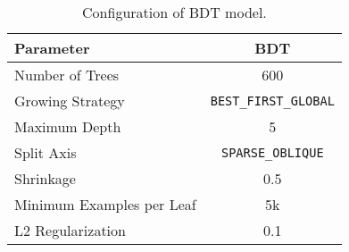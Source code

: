 \begin{table}[htb]
    \centering
    \caption{Configuration of BDT model.}
    \label{tab:bdt_config}
    \begin{tabular}{@{}lc@{}}
    \toprule
    \textbf{Parameter} & \textbf{BDT} \\ \midrule
    Number of Trees & 600 \\
    Growing Strategy & \texttt{BEST\_FIRST\_GLOBAL} \\
    Maximum Depth & 5 \\
    Split Axis & \texttt{SPARSE\_OBLIQUE} \\
    Shrinkage & 0.5 \\
    Minimum Examples per Leaf & 5k \\
    L2 Regularization & 0.1 \\
    \bottomrule
    \end{tabular}
\end{table}